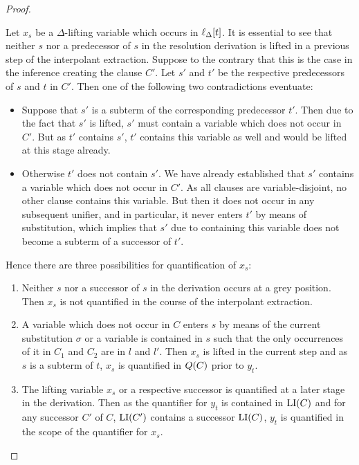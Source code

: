 \documentclass[,%
	draft=false,%
	numbers=noendperiod
	11pt,
	a4paper,
	oneside,%
	openany,
]{memoir}
\begin{document}
\begin{proof}
\begin{description}
			Let $x_s$ be a $\Delta$-lifting variable which occurs in $\ell_{\Delta}[t]$. 
			It is essential to see that neither $s$ nor a predecessor of $s$ in the resolution derivation is lifted in a previous step of the interpolant extraction.
			Suppose to the contrary that this is the case in the inference creating the clause $C'$.
			Let $s'$ and $t'$ be the respective predecessors of $s$ and $t$ in $C'$.
			Then one of the following two contradictions eventuate:
			\begin{itemize}
				\item Suppose that $s'$ is a subterm of the corresponding predecessor $t'$.
					Then due to the fact that $s'$ is lifted, $s'$ must contain a variable which does not occur in $C'$. But as $t'$ contains $s'$, $t'$ contains this variable as well and would be lifted at this stage already.

				\item Otherwise $t'$ does not contain $s'$.
					We have already established that $s'$ contains a variable which does not occur in $C'$.
					As all clauses are variable-disjoint, no other clause contains this variable.
					But then it does not occur in any subsequent unifier, and in particular, it never enters $t'$ by means of substitution, which implies that $s'$ due to containing this variable does not become a subterm of a successor of $t'$.

			\end{itemize}

			Hence there are three possibilities for quantification of $x_s$:
			\begin{enumerate}
			\item Neither $s$ nor a successor of $s$ in the derivation occurs at a grey position. Then $x_s$ is not quantified in the course of the interpolant extraction.
			\item A variable which does not occur in $C$ enters $s$ by means of the current substitution $\sigma$ or a variable is contained in $s$ such that the only occurrences of it in $C_1$ and $C_2$ are in $l$ and $l'$.
				Then $x_s$ is lifted in the current step and as $s$ is a subterm of $t$, $x_s$ is quantified in $Q(C)$ prior to $y_t$.
			\item The lifting variable $x_s$ or a respective successor is quantified at a later stage in the derivation.
				Then as the quantifier for $y_t$ is contained in $\operatorname{LI}(C)$ and for any successor $C'$ of $C$, $\operatorname{LI}(C')$ contains a successor $\operatorname{LI}(C)$, $y_t$ is quantified in the scope of the quantifier for $x_s$.
			\end{enumerate}



\end{description}
\end{proof}
\end{document}
